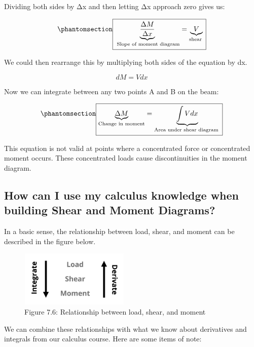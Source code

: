 \documentclass[
  letterpaper,
  DIV=11,
  numbers=noendperiod]{scrreprt}
\theoremstyle{definition}
\theoremstyle{remark}
\begin{document}
Dividing both sides by Δx and then letting Δx approach zero gives us:

\begin{equation}\phantomsection\label{eq-7.3}{
\boxed{\underbrace{\frac{\Delta M}{\Delta x}}_{\text { Slope of moment diagram}}=\underbrace{V}_{\text {shear }}}
}\end{equation}

We could then rearrange this by multiplying both sides of the equation
by dx.

\[
d M=V d x
\]

Now we can integrate between any two points A and B on the beam:

\begin{equation}\phantomsection\label{eq-7.4}{
\boxed{\underbrace{\Delta M}_{\text {Change in moment}}=\underbrace{\int V d x}_{\text {Area under shear diagram }}}
}\end{equation}

This equation is not valid at points where a concentrated force or
concentrated moment occurs. These concentrated loads cause
discontinuities in the moment diagram.

\subsection{How can I use my calculus knowledge when building Shear and
Moment
Diagrams?}\label{how-can-i-use-my-calculus-knowledge-when-building-shear-and-moment-diagrams}

In a basic sense, the relationship between load, shear, and moment can
be described in the figure below.

\begin{figure}[H]

{\centering \includegraphics[width=2.05208in,height=1.05208in]{images/CH7 PNGs/figure 5.6.png}

}

\caption{Figure 7.6: Relationship between load, shear, and moment}

\end{figure}%

We can combine these relationships with what we know about derivatives
and integrals from our calculus course. Here are some items of note:
\end{document}
